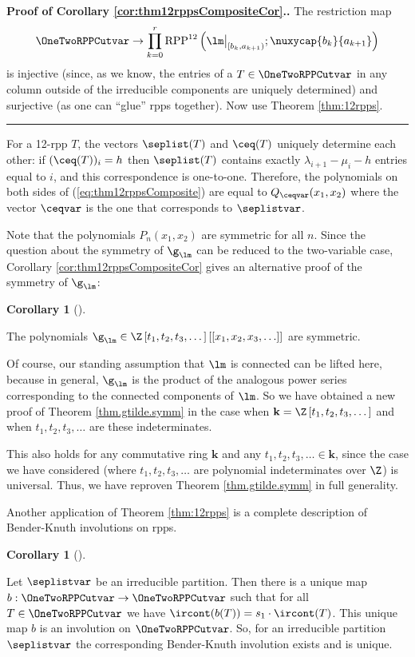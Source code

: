 \documentclass[numbers=enddot,12pt,final,onecolumn,notitlepage]{scrartcl}%
\theoremstyle{definition}
\newtheorem{coro}[theo]{Corollary}
\newenvironment{corollary}[1][]
{\begin{coro}[#1]\begin{leftbar}}
{\end{leftbar}\end{coro}}
\newenvironment{proof}[1][Proof]{\noindent\textbf{#1.} }{\ \rule{0.5em}{0.5em}}
\newcommand{\kk}{\mathbf{k}}
\let\prodnonlimits\prod
\renewcommand{\prod}{\prodnonlimits\limits}
\begin{document}
\begin{proof}[Proof of Corollary \ref{cor:thm12rppsCompositeCor}.] The restriction map
\[
\OneTwoRPPCutvar \to \prod_{k=0}^r \operatorname{RPP}^{12}\left( \lm\big|_{[b_k,a_{k+1})} ; \nuxycap{b_k}{a_{k+1}}\right)
\]
is injective (since, as we know, the entries of a $T \in \OneTwoRPPCutvar$ in any column outside of the irreducible components are uniquely determined) and surjective (as one can ``glue'' rpps together).
Now use Theorem \ref{thm:12rpps}.
\end{proof}

 For a 12-rpp $T$, the vectors $\seplist(T)$ and $\ceq(T)$ uniquely determine each other: if $(\ceq(T))_i=h$ then $\seplist(T)$ contains exactly $\lambda_{i+1}-\mu_i-h$ entries equal to $i$, and this correspondence is one-to-one. Therefore, the polynomials on both sides of (\ref{eq:thm12rppsComposite}) are equal to $Q_{\ceqvar}(x_1,x_2)$ where the vector $\ceqvar$ is the one that corresponds to $\seplistvar$.

 Note that the polynomials $P_n(x_1,x_2)$ are symmetric for all $n$. Since the question about the symmetry of $\g_\lm$ can be reduced to the two-variable case, Corollary \ref{cor:thm12rppsCompositeCor} gives an alternative proof of the symmetry of $\g_\lm$:
\begin{corollary}
 The polynomials $\g_\lm \in \Z\left[t_1,t_2,t_3,\dots\right]\left[\left[x_1, x_2, x_3, \ldots\right]\right]$ are symmetric.
\end{corollary}
 
 Of course, our standing assumption that $\lm$ is connected can be lifted here, because in general, $\g_\lm$ is the product of the analogous power series corresponding to the connected components of $\lm$. So we have obtained a new proof of Theorem \ref{thm.gtilde.symm} in the case when $\kk = \Z\left[t_1,t_2,t_3,\dots\right]$ and when $t_1,t_2,t_3,\ldots$ are these indeterminates.
 
This also holds for any commutative ring $\kk$ and any $t_1, t_2, t_3, \ldots \in \kk$, since the case we have considered (where $t_1, t_2, t_3, \ldots$ are polynomial indeterminates over $\Z$) is universal. Thus, we have reproven Theorem \ref{thm.gtilde.symm} in full generality.

Another application of Theorem \ref{thm:12rpps} is a complete description of Bender-Knuth involutions on rpps.

\begin{corollary}
\label{cor:uniqueBK}
Let $\seplistvar$ be an irreducible partition. Then there is a unique map $b:\OneTwoRPPCutvar\to\OneTwoRPPCutvar$ such that for all $T\in\OneTwoRPPCutvar$ we have $\ircont(b(T)) = s_1 \cdot \ircont(T)$.
This unique map $b$ is an involution on $\OneTwoRPPCutvar$. So, for an irreducible partition $\seplistvar$ the corresponding Bender-Knuth involution exists and is unique.
\end{corollary}
\end{document}
